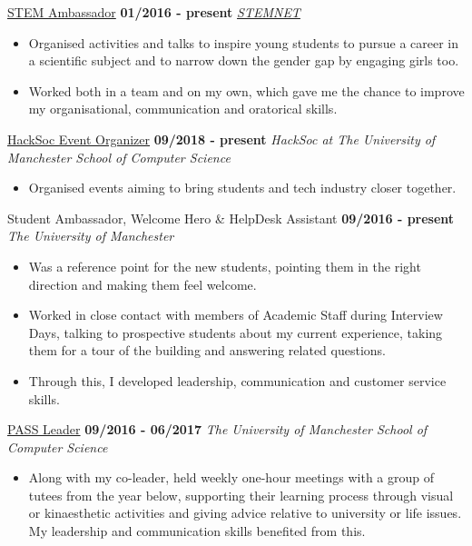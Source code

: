 \documentclass[]{friggeri-cv}
\begin{document}
\begin{entrylist}
  \entry
    {}
    {\href{http://www.stemnet.org.uk/ambassadors/}{STEM Ambassador}}
    {\textbf{01/2016 - present}}
    {\emph{\href{http://www.stemnet.org.uk/}{STEMNET}}}
    \begin{itemize}
        \item Organised activities and talks to inspire young students to pursue a career in a scientific subject and to narrow down the gender gap by engaging girls too.
        \item Worked both in a team and on my own, which gave me the chance to improve my organisational, communication and oratorical skills.\\
    \end{itemize}
\entry
    {}
    {\href{https://www.hacksoc.com}{HackSoc Event Organizer}}
    {\textbf{09/2018 - present}}
    {\emph{HackSoc at The University of Manchester School of Computer Science}}
    \begin{itemize}
        \item Organised events aiming to bring students and tech industry closer together.\\
    \end{itemize}
   \entry
    {}
    {Student Ambassador, Welcome Hero \& HelpDesk Assistant}
    {\textbf{09/2016 - present}}
    {\emph{The University of Manchester}}
    \begin{itemize}
        \item Was a reference point for the new students, pointing them in the right direction and making them feel welcome. 
        \item Worked in close contact with members of Academic Staff during Interview Days, talking to prospective students about my current experience, taking them for a tour of the building and answering related questions. 
        \item Through this, I developed leadership, communication and customer service skills.\\
    \end{itemize}
  \entry
    {}
    {\href{http://www.pass.manchester.ac.uk/}{PASS Leader}}
    {\textbf{09/2016 - 06/2017}}
    {\emph{The University of Manchester School of Computer Science}}
    \begin{itemize}
        \item Along with my co-leader, held weekly one-hour meetings with a group of tutees from the year below, supporting their learning process through visual or kinaesthetic activities and giving advice relative to university or life issues. My leadership and communication skills benefited from this.\\

\end{itemize}
\end{entrylist}
\end{document}
